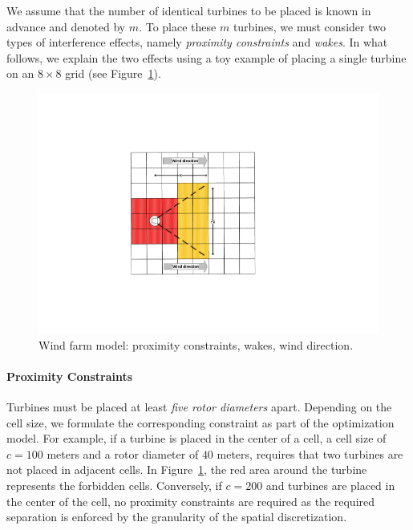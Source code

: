 \documentclass[preprint,12pt]{elsarticle}
\begin{document}
We assume that the number of identical turbines to be placed is known 
in advance and denoted by $m$. To place these $m$ turbines, 
we must consider two types of interference effects, namely \emph{proximity constraints} and \emph{wakes}.
In what follows, we explain the two effects using a toy example of placing a single turbine on an 
$8\times8$ grid (see Figure~\ref{fig:field_model}).

\begin{figure}[t]
	\centering
	\includegraphics[scale = 0.9]{field_model.pdf}

	\caption{Wind farm model: proximity constraints, wakes, wind direction.}\label{fig:field_model}
\end{figure}



\paragraph{Proximity Constraints}
Turbines must be placed at least \emph{five rotor diameters}
apart. Depending on the cell size, we formulate the
corresponding constraint as part of the optimization model. For
example, if a turbine is placed in the center of a
cell, a cell size of $c = 100$ meters and a rotor diameter
of $40$ meters, requires that two turbines are not placed in adjacent cells. In Figure~\ref{fig:field_model}, the red area
around the turbine represents the forbidden cells. Conversely, if $c = 200$ and turbines are placed in the center of the cell, no proximity constraints are required as the required separation is enforced by the granularity of the spatial discretization.
	 
\end{document}
